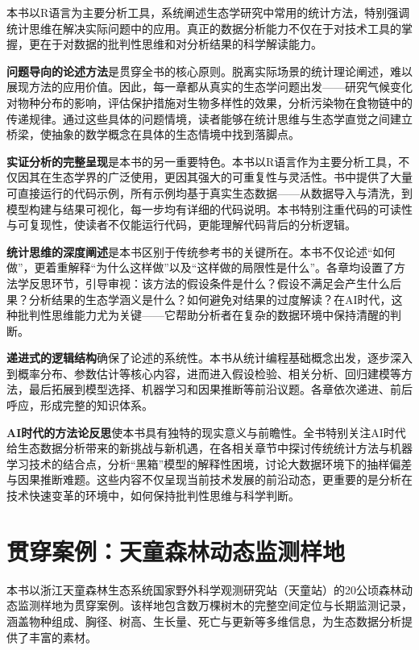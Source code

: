 \documentclass[
  twoside,12pt,fontset=none]{ctexbook}
\begin{document}
本书以R语言为主要分析工具，系统阐述生态学研究中常用的统计方法，特别强调统计思维在解决实际问题中的应用。真正的数据分析能力不仅在于对技术工具的掌握，更在于对数据的批判性思维和对分析结果的科学解读能力。

\textbf{问题导向的论述方法}是贯穿全书的核心原则。脱离实际场景的统计理论阐述，难以展现方法的应用价值。因此，每一章都从真实的生态学问题出发------研究气候变化对物种分布的影响，评估保护措施对生物多样性的效果，分析污染物在食物链中的传递规律。通过这些具体的问题情境，读者能够在统计思维与生态学直觉之间建立桥梁，使抽象的数学概念在具体的生态情境中找到落脚点。

\textbf{实证分析的完整呈现}是本书的另一重要特色。本书以R语言作为主要分析工具，不仅因其在生态学界的广泛使用，更因其强大的可重复性与灵活性。书中提供了大量可直接运行的代码示例，所有示例均基于真实生态数据------从数据导入与清洗，到模型构建与结果可视化，每一步均有详细的代码说明。本书特别注重代码的可读性与可复现性，使读者不仅能运行代码，更能理解代码背后的分析逻辑。

\textbf{统计思维的深度阐述}是本书区别于传统参考书的关键所在。本书不仅论述``如何做''，更着重解释``为什么这样做''以及``这样做的局限性是什么''。各章均设置了方法学反思环节，引导审视：该方法的假设条件是什么？假设不满足会产生什么后果？分析结果的生态学涵义是什么？如何避免对结果的过度解读？在AI时代，这种批判性思维能力尤为关键------它帮助分析者在复杂的数据环境中保持清醒的判断。

\textbf{递进式的逻辑结构}确保了论述的系统性。本书从统计编程基础概念出发，逐步深入到概率分布、参数估计等核心内容，进而进入假设检验、相关分析、回归建模等方法，最后拓展到模型选择、机器学习和因果推断等前沿议题。各章依次递进、前后呼应，形成完整的知识体系。

\textbf{AI时代的方法论反思}使本书具有独特的现实意义与前瞻性。全书特别关注AI时代给生态数据分析带来的新挑战与新机遇，在各相关章节中探讨传统统计方法与机器学习技术的结合点，分析``黑箱''模型的解释性困境，讨论大数据环境下的抽样偏差与因果推断难题。这些内容不仅呈现当前技术发展的前沿动态，更重要的是分析在技术快速变革的环境中，如何保持批判性思维与科学判断。

\hypertarget{ux8d2fux7a7fux6848ux4f8bux5929ux7ae5ux68eeux6797ux52a8ux6001ux76d1ux6d4bux6837ux5730}{%
\section{贯穿案例：天童森林动态监测样地}\label{ux8d2fux7a7fux6848ux4f8bux5929ux7ae5ux68eeux6797ux52a8ux6001ux76d1ux6d4bux6837ux5730}}

本书以浙江天童森林生态系统国家野外科学观测研究站（天童站）的20公顷森林动态监测样地为贯穿案例。该样地包含数万棵树木的完整空间定位与长期监测记录，涵盖物种组成、胸径、树高、生长量、死亡与更新等多维信息，为生态数据分析提供了丰富的素材。
\end{document}
